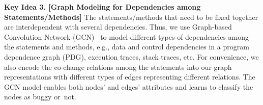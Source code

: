 {\bf Key Idea 3. [Graph Modeling for Dependencies among Statements/Methods]} The
statements/methods that need to be fixed together are
interdependent with several dependencies. Thus, we
use Graph-based Convolution Network (GCN)~\cite{li2019gcn} to model
different types of dependencies among the statements and methods,
e.g., data and control dependencies in a program dependence graph
(PDG), execution traces, stack traces, etc. For convenience, we also
encode the co-change relations among the statements into our graph
representations with different types of edges representing different
relations. The GCN model enables both nodes' and edges' attributes and
learns to classify the nodes as buggy or~not.









